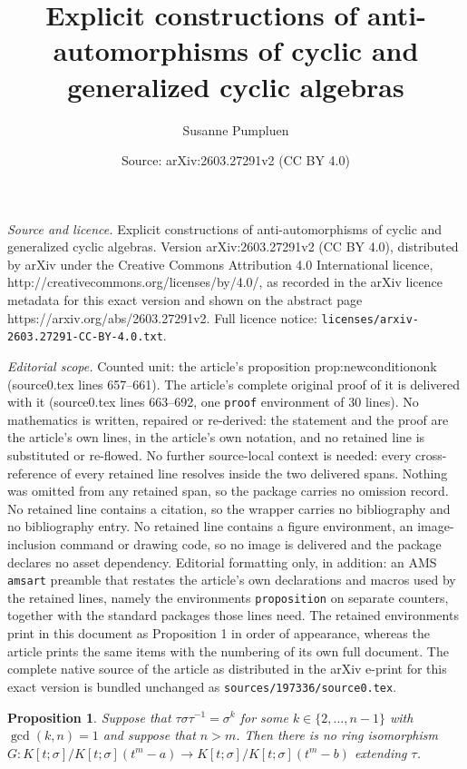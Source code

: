 \documentclass[10pt,a4paper]{amsart}
\title{Explicit constructions of anti-automorphisms of cyclic and generalized cyclic algebras}
\author{Susanne Pumpluen}
\date{Source: arXiv:2603.27291v2 (CC BY 4.0)}
\newtheorem{proposition}{Proposition}
\begin{document}
\maketitle

\noindent\emph{Source and licence.} Explicit constructions of anti-automorphisms of cyclic and generalized cyclic algebras. Version arXiv:2603.27291v2 (CC BY 4.0), distributed by arXiv under the Creative Commons Attribution 4.0 International licence, http://creativecommons.org/licenses/by/4.0/, as recorded in the arXiv licence metadata for this exact version and shown on the abstract page https://arxiv.org/abs/2603.27291v2. Full licence notice: \texttt{licenses/arxiv-2603.27291-CC-BY-4.0.txt}.\par\smallskip

\noindent\textit{Editorial scope.} Counted unit: the article's proposition prop:newconditiononk (source0.tex lines 657--661). The article's complete original proof of it is delivered with it (source0.tex lines 663--692, one \texttt{proof} environment of 30 lines). No mathematics is written, repaired or re-derived: the statement and the proof are the article's own lines, in the article's own notation, and no retained line is substituted or re-flowed.  No further source-local context is needed: every cross-reference of every retained line resolves inside the two delivered spans.  Nothing was omitted from any retained span, so the package carries no omission record.  No retained line contains a citation, so the wrapper carries no bibliography and no bibliography entry.  No retained line contains a figure environment, an image-inclusion command or drawing code, so no image is delivered and the package declares no asset dependency.  Editorial formatting only, in addition: an AMS \texttt{amsart} preamble that restates the article's own declarations and macros used by the retained lines, namely the environments \texttt{proposition} on separate counters, together with the standard packages those lines need.  The retained environments print in this document as Proposition 1 in order of appearance, whereas the article prints the same items with the numbering of its own full document.  The complete native source of the article as distributed in the arXiv e-print for this exact version is bundled unchanged as \texttt{sources/197336/source0.tex}.
 \begin{proposition}\label{prop:newconditiononk}
   Suppose that $\tau \sigma\tau^{-1}=\sigma^k$ for some $k\in \{2,\dots, n-1 \}$ with $\gcd (k, n)=1$ and suppose that $n> m$.
   Then there is no ring isomorphism
    $G:K[t;\sigma]/K[t;\sigma](t^m-a)\to K[t;\sigma]/K[t;\sigma](t^m-b)$ extending $\tau$.
 \end{proposition}
\end{document}
